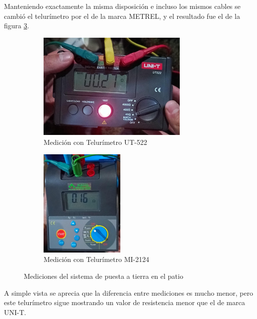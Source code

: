 Manteniendo exactamente la misma disposición e incluso los mismos cables se cambió el telurímetro por el de la marca METREL, y el resultado fue el de la figura \ref{fig:tel2patio}.

\begin{figure}[h!]
        \begin{subfigure}[b]{0.5\textwidth}
        \centering  
        \includegraphics[width=0.8\textwidth]{Imagenes/tel1patio.jpeg}
        \caption{Medición con Telurímetro UT-522}
        \label{fig:tel1patio}
    \end{subfigure}
    \hfill
    \begin{subfigure}[b]{0.49\textwidth}
        \centering
        \includegraphics[width=0.45\textwidth]{Imagenes/tel2patio.jpeg}
        \caption{Medición con Telurímetro MI-2124}
        \label{fig:tel2patio}
    \end{subfigure}
    \caption{Mediciones del sistema de puesta a tierra en el patio}
\end{figure}

A simple vista se aprecia que la diferencia entre mediciones es mucho menor, pero este telurímetro sigue mostrando un valor de resistencia menor que el de marca UNI-T.


